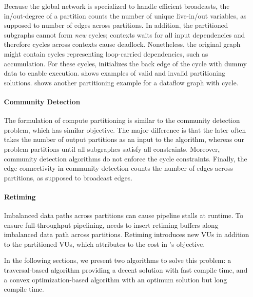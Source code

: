 Because the global network is specialized to handle efficient broadcasts, 
the in/out-degree of a partition counts the number of unique live-in/out variables, as supposed to
number of edges across partitions.
In addition, the partitioned subgraphs cannot form {\em new} cycles; contexts waits for all
input dependencies and therefore cycles across contexts cause deadlock. 
Nonetheless, the original graph might contain cycles representing loop-carried dependencies, such as
accumulation. For these cycles, \name initializes the back edge of the cycle with dummy data to
enable execution.
 shows examples of valid and invalid partitioning solutions.
 shows another partitioning example for a dataflow graph with cycle.

\paragraph{Community Detection}
The formulation of compute partitioning is similar to the community detection problem\cite{community}, which has similar
objective. The major difference is that the later often takes the number of output partitions as an
input to the algorithm, whereas our problem partitions until all subgraphes satisfy all constraints.
Moreover, community detection algorithms do not enforce the cycle constraints. 
Finally, the edge connectivity in community detection counts the number of edges across partitions, as supposed to broadcast edges.

\paragraph{Retiming}
Imbalanced data paths across partitions can cause pipeline stalls at runtime.
To ensure full-throughput pipelining, \name needs to insert retiming buffers along imbalanced data path across
partitions.
Retiming introduces new VUs in addition to the partitioned VUs, which attributes to the cost in
's objective.

In the following sections, we present two algorithms to solve this problem:
a traversal-based algorithm providing a decent solution with fast compile time, and a convex
optimization-based algorithm with an optimum solution but long compile time.


